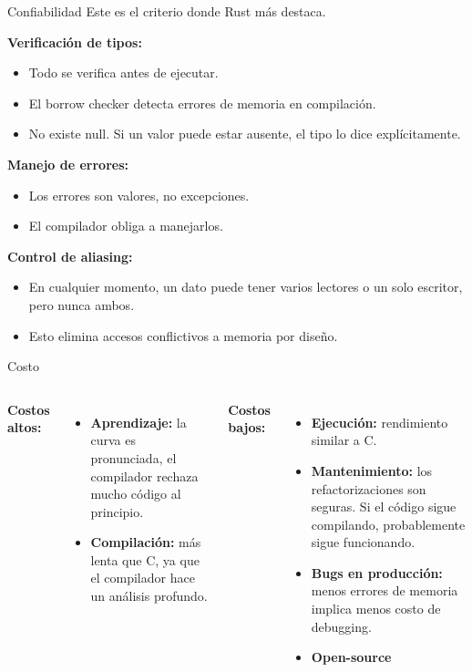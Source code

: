 \documentclass[11pt, aspectratio=169]{beamer}
\begin{document}
	\begin{frame}{Confiabilidad}
		Este es el criterio donde Rust más destaca.



			\textbf{Verificación de tipos:}
			\begin{itemize}
				\item Todo se verifica antes de ejecutar.
				\item El borrow checker detecta errores de memoria en compilación.
				\item No existe null. Si un valor puede estar ausente, el tipo lo dice explícitamente.
			\end{itemize}

			\textbf{Manejo de errores:}
			\begin{itemize}
				\item Los errores son valores, no excepciones.
				\item El compilador obliga a manejarlos.
			\end{itemize}
			

			\textbf{Control de aliasing:}
			\begin{itemize}
				\item En cualquier momento, un dato puede tener varios lectores o un solo escritor, pero nunca ambos.
				\item Esto elimina accesos conflictivos a memoria por diseño.
			\end{itemize}


					


	\end{frame}

	\begin{frame}{Costo}
		\begin{columns}
			\textbf{Costos altos:}
			\begin{itemize}
				\item \textbf{Aprendizaje:} la curva es pronunciada, el compilador rechaza mucho código al principio.
				\item \textbf{Compilación:} más lenta que C, ya que el compilador hace un análisis profundo.

			\end{itemize}
			
			\textbf{Costos bajos:}
			\begin{itemize}
				\item \textbf{Ejecución:} rendimiento similar a C.
				\item \textbf{Mantenimiento:} los refactorizaciones son seguras. Si el código sigue compilando, probablemente sigue funcionando.
				\item \textbf{Bugs en producción:} menos errores de memoria implica menos costo de debugging.
				\item \textbf{Open-source}
			\end{itemize}
		\end{columns}
	\end{frame}
\end{document}
